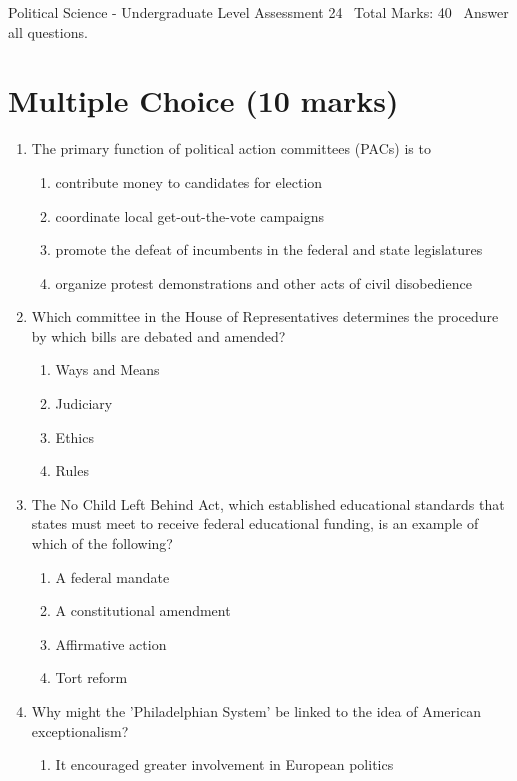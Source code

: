 \documentclass[12pt]{article}
\begin{document}
\begin{center}
Political Science - Undergraduate Level Assessment 24 \
Total Marks: 40 \
Answer all questions.
\end{center}

\section*{Multiple Choice (10 marks)}
\begin{enumerate}[label=\arabic*.]
\item The primary function of political action committees (PACs) is to
\begin{enumerate}[label=(\alph*)]
    \item contribute money to candidates for election
    \item coordinate local get-out-the-vote campaigns
    \item promote the defeat of incumbents in the federal and state legislatures
    \item organize protest demonstrations and other acts of civil disobedience
\end{enumerate}
\item Which committee in the House of Representatives determines the procedure by which bills are debated and amended?
\begin{enumerate}[label=(\alph*)]
    \item Ways and Means
    \item Judiciary
    \item Ethics
    \item Rules
\end{enumerate}
\item The No Child Left Behind Act, which established educational standards that states must meet to receive federal educational funding, is an example of which of the following?
\begin{enumerate}[label=(\alph*)]
    \item A federal mandate
    \item A constitutional amendment
    \item Affirmative action
    \item Tort reform
\end{enumerate}
\item Why might the 'Philadelphian System' be linked to the idea of American exceptionalism?
\begin{enumerate}[label=(\alph*)]
    \item It encouraged greater involvement in European politics

\end{enumerate}
\end{enumerate}
\end{document}
